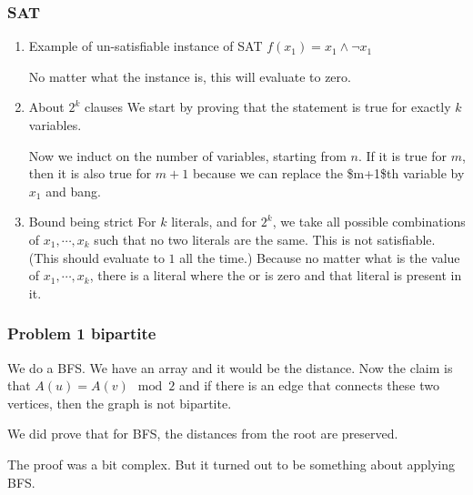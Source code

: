 \documentclass[11pt]{article}
\begin{document}
\subsubsection{SAT}
\label{sec:org29c1128}
\begin{enumerate}
\item Example of un-satisfiable instance of SAT
\label{sec:orge1658cf}
\(f(x_1) = x_1 \wedge \neg x_1\)

No matter what the instance is, this will evaluate to zero. 
\item About \(2^k\) clauses
\label{sec:orgd19b393}
We start by proving that the statement is true for exactly \(k\) variables. 

Now we induct on the number of variables, starting from \(n\). If it is true
for \(m\), then it is also true for \(m+1\) because we can replace the \$m+1\$th
variable by \(x_1\) and bang.
\item Bound being strict
\label{sec:orga9a5938}
For \(k\) literals, and for \(2^k\), we take all possible combinations of \(x_1,
     \cdots, x_k\) such that no two literals are the same. This is not
satisfiable. (This should evaluate to \(1\) all the time.) Because no matter
what is the value of \(x_1, \cdots, x_k\), there is a literal where the or is
zero and that literal is present in it.
\end{enumerate}
\subsubsection{Problem 1 bipartite}
\label{sec:org38a1623}
We do a BFS. We have an array and it would be the distance. Now the claim is
that \(A(u) = A(v) \mod 2\) and if there is an edge that connects these two
vertices, then the graph is not bipartite.

We did prove that for BFS, the distances from the root are preserved.

The proof was a bit complex. But it turned out to be something about
applying BFS.
\end{document}
